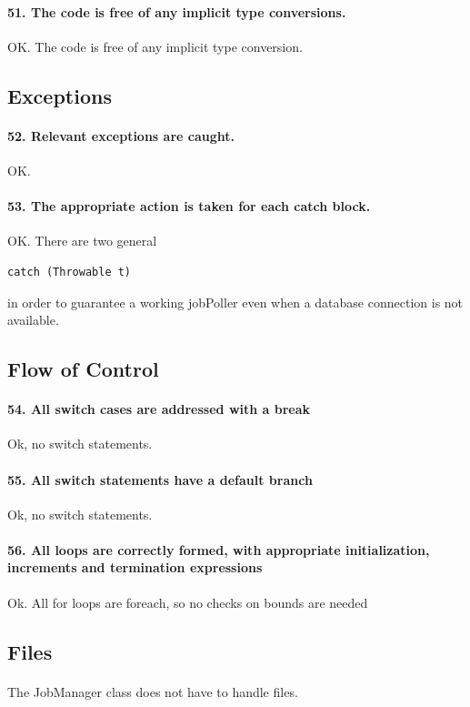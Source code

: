 \documentclass[english]{article}
\begin{document}
{{\paragraph{51. The code is free of any implicit type conversions.}
OK. The code is free of any implicit type conversion.
\subsection{Exceptions}

\paragraph{52. Relevant exceptions are caught.}
OK.
\paragraph{53. The appropriate action is taken for each catch block.}
OK. There are two general
\begin{lstlisting}
catch (Throwable t)
\end{lstlisting} in order to guarantee a working jobPoller even when a database connection is not available.

\subsection{Flow of Control}
\paragraph{54. All switch cases are addressed with a break}
Ok, no switch statements.

\paragraph{55. All switch statements have a default branch}
Ok, no switch statements.

\paragraph{56. All loops are correctly formed, with appropriate initialization, increments and termination expressions}
Ok.
All for loops are foreach, so no checks on bounds are needed

\subsection{Files}
\paragraph{}
The JobManager class does not have to handle files.

}}
\end{document}
